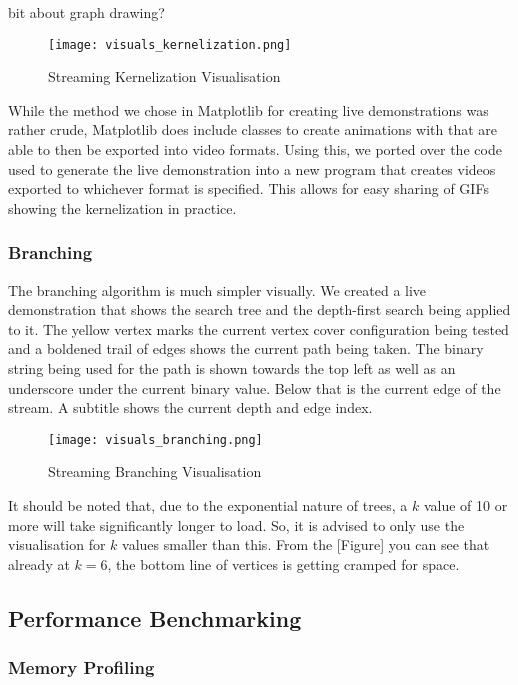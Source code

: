 bit about graph drawing?

\begin{figure}[h]
    \centering
    \texttt{[image: visuals\_kernelization.png]}
    \caption{Streaming Kernelization Visualisation}
\end{figure}

While the method we chose in Matplotlib for creating live demonstrations
was rather crude, Matplotlib does include classes to create animations
with that are able to then be exported into video formats. Using this,
we ported over the code used to generate the live demonstration into a
new program that creates videos exported to whichever format is
specified. This allows for easy sharing of GIFs showing the
kernelization in practice.

\subsubsection{Branching}

The branching algorithm is much simpler visually. We created a live
demonstration that shows the search tree and the depth-first search
being applied to it. The yellow vertex marks the current vertex cover
configuration being tested and a boldened trail of edges shows the
current path being taken. The binary string being used for the path is
shown towards the top left as well as an underscore under the current
binary value. Below that is the current edge of the stream. A subtitle
shows the current depth and edge index.

\begin{figure}[h]
    \centering
    \texttt{[image: visuals\_branching.png]}
    \caption{Streaming Branching Visualisation}
\end{figure}

It should be noted that, due to the exponential nature of trees, a \(k\)
value of 10 or more will take significantly longer to load. So, it is
advised to only use the visualisation for \(k\) values smaller than
this. From the {[}Figure{]} you can see that already at \(k=6\), the
bottom line of vertices is getting cramped for space.

\subsection{Performance Benchmarking}

\subsubsection{Memory Profiling}

